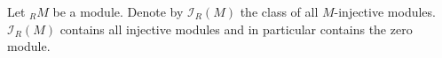 Let ${}_R M$ be a module. Denote by $\mathcal{I}_R(M)$ the class of all $M$-injective modules. $\mathcal{I}_R(M)$ contains all injective modules and in particular contains the zero module.
